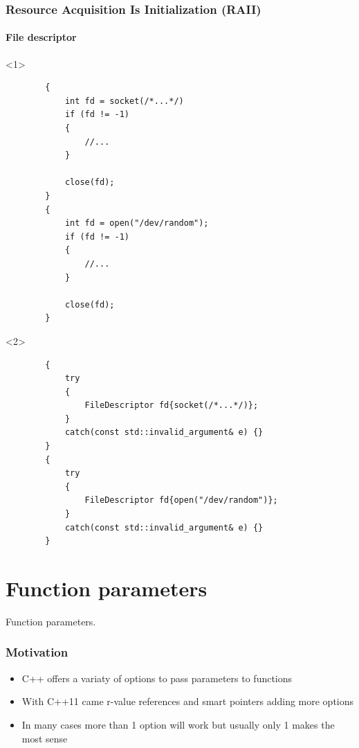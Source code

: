 \documentclass{beamer}
\begin{document}
\begin{frame}[fragile,t]
\frametitle{Resource Acquisition Is Initialization (RAII)}
\framesubtitle{File descriptor}
    \begin{onlyenv}<1>
    \begin{lstlisting}
        {
            int fd = socket(/*...*/)
            if (fd != -1)
            {
                //...
            }

            close(fd);
        }
        {
            int fd = open("/dev/random");
            if (fd != -1)
            {
                //...
            }

            close(fd);
        }
    \end{lstlisting}
    \end{onlyenv}
    
    \begin{onlyenv}<2>
    \begin{lstlisting}
        {
            try 
            {
                FileDescriptor fd{socket(/*...*/)};
            }
            catch(const std::invalid_argument& e) {}
        }
        {
            try 
            {
                FileDescriptor fd{open("/dev/random")};
            }
            catch(const std::invalid_argument& e) {}
        }
    \end{lstlisting}
    \end{onlyenv}
\end{frame}

\section{Function parameters}

\begin{frame}
    \begin{center}
        Function parameters.
    \end{center}
\end{frame}

\begin{frame}
\frametitle{Motivation}
    \begin{itemize}
        \item C++ offers a variaty of options to pass parameters to functions
        \pause
        \item With C++11 came r-value references and smart pointers adding more options
        \pause
        \item In many cases more than 1 option will work but usually only 1 makes the most sense
    \end{itemize}
\end{frame}
\end{document}
